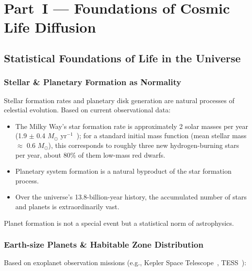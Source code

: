 \documentclass[aps,prd,twocolumn,superscriptaddress,nofootinbib]{revtex4-2}
\begin{document}
\section{Part~I --- Foundations of Cosmic Life Diffusion}\label{sec:part1}

\subsection{Statistical Foundations of Life in the Universe}\label{sec:stat-foundations}

\subsubsection{Stellar \& Planetary Formation as Normality}\label{sec:stellar-formation}

Stellar formation rates and planetary disk generation are natural processes of celestial evolution. Based on current observational data:

\begin{itemize}
  \item The Milky Way's star formation rate is approximately 2 solar masses per year (1.9 $\pm$ 0.4 $M_{\odot}$ yr$^{-1}$~\cite{Chomiuk2011}); for a standard initial mass function (mean stellar mass $\approx$ 0.6 $M_{\odot}$), this corresponds to roughly three new hydrogen-burning stars per year, about 80\% of them low-mass red dwarfs.
  \item Planetary system formation is a natural byproduct of the star formation process.
  \item Over the universe's 13.8-billion-year history, the accumulated number of stars and planets is extraordinarily vast.
\end{itemize}

Planet formation is not a special event but a statistical norm of astrophysics.

\subsubsection{Earth-size Planets \& Habitable Zone Distribution}\label{sec:earthlike}

Based on exoplanet observation missions (e.g., Kepler Space Telescope~\cite{NASA_Kepler}, TESS~\cite{NASA_TESS}):
\end{document}
